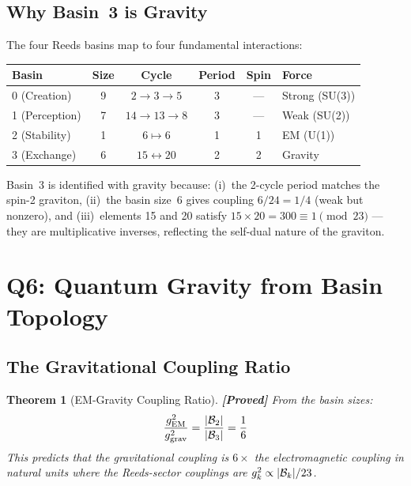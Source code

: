 \documentclass[12pt,a4paper]{article}
\newcommand{\proved}[1]{\textcolor{proved}{\textbf{[Proved]}} #1}
\newtheorem{theorem}{Theorem}[section]\newtheorem{proposition}[theorem]{Proposition}
\theoremstyle{definition}\newtheorem{definition}[theorem]{Definition}
\theoremstyle{remark}\newtheorem{remark}[theorem]{Remark}
\begin{document}
\subsection{Why Basin~3 is Gravity}

The four Reeds basins map to four fundamental interactions:
\begin{center}
\begin{tabular}{lccccl}
\toprule
\textbf{Basin} & \textbf{Size} & \textbf{Cycle} & \textbf{Period} & \textbf{Spin} & \textbf{Force} \\
\midrule
0 (Creation) & 9 & $2 \to 3 \to 5$ & 3 & --- & Strong (SU(3)) \\
1 (Perception) & 7 & $14 \to 13 \to 8$ & 3 & --- & Weak (SU(2)) \\
2 (Stability) & 1 & $6 \mapsto 6$ & 1 & 1 & EM (U(1)) \\
3 (Exchange) & 6 & $15 \leftrightarrow 20$ & 2 & 2 & Gravity \\
\bottomrule
\end{tabular}
\end{center}

Basin~3 is identified with gravity because: (i)~the 2-cycle period matches the
spin-2 graviton, (ii)~the basin size~6 gives coupling $6/24 = 1/4$ (weak but
nonzero), and (iii)~elements 15 and 20 satisfy $15 \times 20 = 300 \equiv 1
\pmod{23}$ --- they are multiplicative inverses, reflecting the self-dual nature
of the graviton.

\section{Q6: Quantum Gravity from Basin Topology}
\label{sec:gravity}

\subsection{The Gravitational Coupling Ratio}

\begin{theorem}[EM-Gravity Coupling Ratio]
\label{thm:coupling_ratio}
\proved{From the basin sizes:}
\begin{equation}
  \frac{g_{\mathrm{EM}}^2}{g_{\mathrm{grav}}^2}
  = \frac{|\mathcal{B}_2|}{|\mathcal{B}_3|}
  = \frac{1}{6}
\end{equation}
This predicts that the gravitational coupling is $6\times$ the electromagnetic
coupling in natural units where the Reeds-sector couplings are
$g_k^2 \propto |\mathcal{B}_k|/23$.
\end{theorem}
\end{document}
